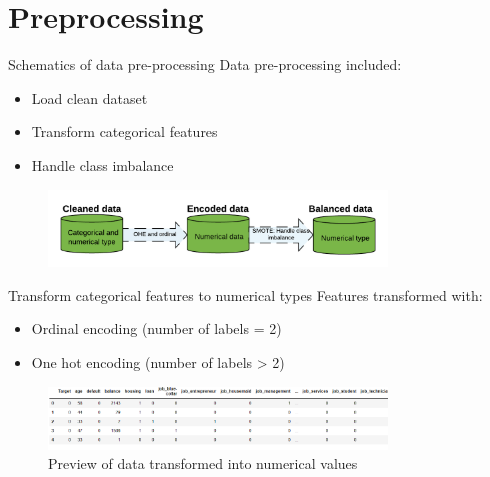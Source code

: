 \section{Preprocessing} %

\begin{frame}{Schematics of data pre-processing}
Data pre-processing included:
\begin{itemize}
    \item Load clean dataset
    \item Transform categorical features 
    \item Handle class imbalance
\end{itemize}
\begin{figure}
		\includegraphics[width=9.0cm]{figures/preprocessing.png}
	\end{figure}
\end{frame}

\begin{frame}{Transform categorical features to numerical types}
Features transformed with:
\begin{itemize}
    \item Ordinal encoding (number of labels = 2)
    \item One hot encoding (number of labels > 2) 
\end{itemize}
\begin{figure}
		\includegraphics[width=9.0cm]{figures/fig_df_OHE.PNG}
		\caption{Preview of data transformed into numerical values}
	\end{figure}
\end{frame}

